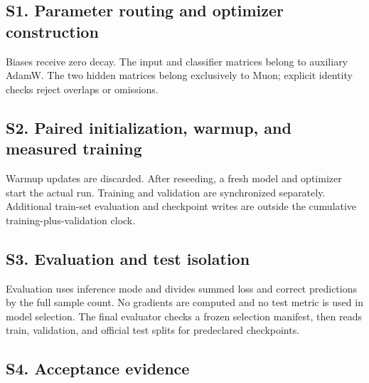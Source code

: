 \documentclass[10pt,a4paper,twocolumn]{article}
\begin{document}
\subsection*{S1. Parameter routing and optimizer construction}
Biases receive zero decay. The input and classifier matrices belong to auxiliary AdamW. The two hidden matrices belong exclusively to Muon; explicit identity checks reject overlaps or omissions.

\clearpage
\subsection*{S2. Paired initialization, warmup, and measured training}
Warmup updates are discarded. After reseeding, a fresh model and optimizer start the actual run. Training and validation are synchronized separately. Additional train-set evaluation and checkpoint writes are outside the cumulative training-plus-validation clock.

\clearpage
\subsection*{S3. Evaluation and test isolation}
Evaluation uses inference mode and divides summed loss and correct predictions by the full sample count. No gradients are computed and no test metric is used in model selection. The final evaluator checks a frozen selection manifest, then reads train, validation, and official test splits for predeclared checkpoints.


\subsection*{S4. Acceptance evidence}

\end{document}
